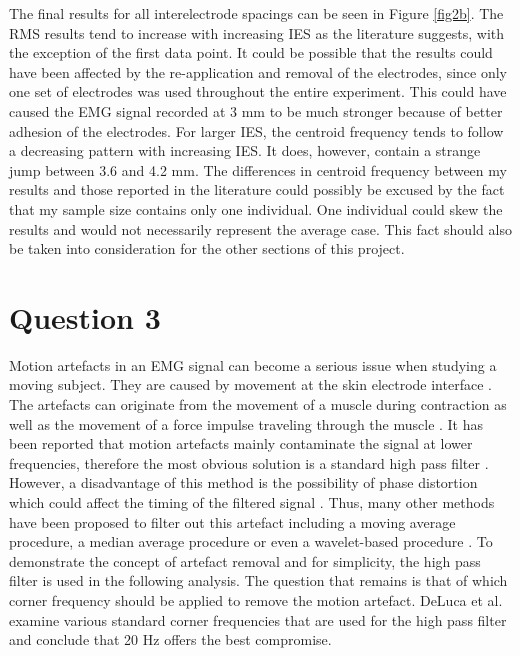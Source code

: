 \documentclass[11pt]{article}
\numberwithin{equation}{section}	%
\begin{document}
The final results for all interelectrode spacings can be seen in Figure \ref{fig2b}. The RMS results tend to increase with increasing IES as the literature suggests, with the exception of the first data point. It could be possible that the results could have been affected by the re-application and removal of the electrodes, since only one set of electrodes was used throughout the entire experiment. This could have caused the EMG signal recorded at 3 mm to be much stronger because of better adhesion of the electrodes. For larger IES, the centroid frequency tends to follow a decreasing pattern with increasing IES. It does, however, contain a strange jump between 3.6 and 4.2 mm. The differences in centroid frequency between my results and those reported in the literature could possibly be excused by the fact that my sample size contains only one individual. One individual could skew the results and would not necessarily represent the average case. This fact should also be taken into consideration for the other sections of this project.


\section*{Question 3}
Motion artefacts in an EMG signal can become a serious issue when studying a moving subject. They are caused by movement at the skin electrode interface \cite{DeLuca2010}. The artefacts can originate from the movement of a muscle during contraction as well as the movement of a force impulse traveling through the muscle \cite{DeLuca2010}. It has been reported that motion artefacts mainly contaminate the signal at lower frequencies, therefore the most obvious solution is a standard high pass filter \cite{Conforto1999}. However, a disadvantage of this method is the possibility of phase distortion which could affect the timing of the filtered signal \cite{Conforto1999}. Thus, many other methods have been proposed to filter out this artefact including a moving average procedure, a median average procedure or even a wavelet-based procedure \cite{Conforto1999}. To demonstrate the concept of artefact removal and for simplicity, the high pass filter is used in the following analysis. The question that remains is that of which corner frequency should be applied to remove the motion artefact. DeLuca et al. \cite{DeLuca2010} examine various standard corner frequencies that are used for the high pass filter and conclude that 20 Hz offers the best compromise.
\end{document}
